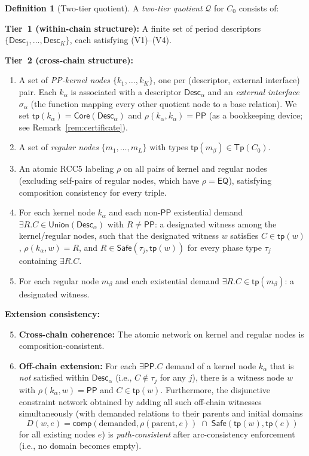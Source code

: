 \documentclass[a4paper,11pt]{article}
\theoremstyle{definition}
\newtheorem{definition}[theorem]{Definition}
\newcommand{\EQ}{\ensuremath{\mathsf{EQ}}}
\newcommand{\PP}{\ensuremath{\mathsf{PP}}}
\newcommand{\comp}{\ensuremath{\mathsf{comp}}}
\newcommand{\tp}{\ensuremath{\mathsf{tp}}}
\newcommand{\Tp}{\ensuremath{\mathsf{Tp}}}
\newcommand{\Desc}{\ensuremath{\mathsf{Desc}}}
\newcommand{\Core}{\ensuremath{\mathsf{Core}}}
\newcommand{\Union}{\ensuremath{\mathsf{Union}}}
\newcommand{\Safe}{\ensuremath{\mathsf{Safe}}}
\begin{document}
\begin{definition}[Two-tier quotient]\label{def:quotient}
A \emph{two-tier quotient} $\mathcal{Q}$ for $C_0$ consists of:

\medskip\noindent\textbf{Tier~1 (within-chain structure):}
A finite set of period descriptors
$\{\Desc_1, \ldots, \Desc_K\}$, each satisfying (V1)--(V4).

\medskip\noindent\textbf{Tier~2 (cross-chain structure):}
\begin{enumerate}[label=(T\arabic*)]
\item A set of \emph{PP-kernel nodes}
  $\{k_1, \ldots, k_K\}$, one per (descriptor, external interface)
  pair.  Each $k_\alpha$ is associated with a descriptor
  $\Desc_\alpha$ and an \emph{external interface}
  $\sigma_\alpha$ (the function mapping every other quotient node to
  a base relation).  We set
  $\tp(k_\alpha) = \Core(\Desc_\alpha)$ and
  $\rho(k_\alpha, k_\alpha) = \PP$ (as a bookkeeping device; see
  Remark~\ref{rem:certificate}).
\item A set of \emph{regular nodes} $\{m_1, \ldots, m_L\}$ with
  types $\tp(m_\beta) \in \Tp(C_0)$.
\item An atomic RCC5 labeling $\rho$ on all pairs of
  kernel and regular nodes (excluding self-pairs of regular nodes,
  which have $\rho = \EQ$), satisfying composition consistency for
  every triple.
\item For each kernel node $k_\alpha$ and each non-$\PP$ existential
  demand $\exists R.C \in \Union(\Desc_\alpha)$ with
  $R \ne \PP$: a designated witness among the kernel/regular nodes,
  such that the designated witness $w$ satisfies $C \in \tp(w)$,
  $\rho(k_\alpha, w) = R$, and $R \in \Safe(\tau_j, \tp(w))$ for
  every phase type $\tau_j$ containing $\exists R.C$.
\item For each regular node $m_\beta$ and each existential demand
  $\exists R.C \in \tp(m_\beta)$: a designated witness.
\end{enumerate}

\medskip\noindent\textbf{Extension consistency:}
\begin{enumerate}[label=(V\arabic*),start=5]
\setcounter{enumi}{4}
\item \textbf{Cross-chain coherence:} The atomic network on
  kernel and regular nodes is composition-consistent.
\item \textbf{Off-chain extension:} For each $\exists\PP.C$ demand
  of a kernel node $k_\alpha$ that is \emph{not} satisfied within
  $\Desc_\alpha$ (i.e., $C \notin \tau_j$ for any $j$), there is
  a witness node $w$ with $\rho(k_\alpha, w) = \PP$ and
  $C \in \tp(w)$.  Furthermore, the disjunctive constraint network
  obtained by adding all such off-chain witnesses simultaneously
  (with demanded relations to their parents and initial domains
  \begin{equation}\label{eq:v6-domain}
  D(w, e) = \comp(\text{demanded}, \rho(\text{parent}, e)) \;\cap\;
  \Safe(\tp(w), \tp(e))
  \end{equation}
  for all existing nodes $e$) is \emph{path-consistent} after
  arc-consistency enforcement (i.e., no domain becomes empty).
\end{enumerate}
\end{definition}
\end{document}
